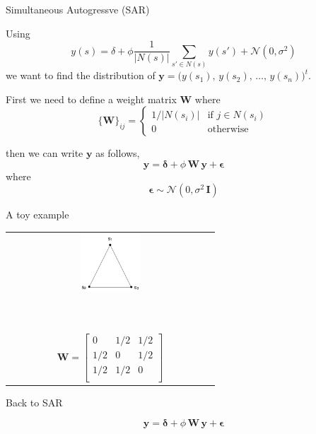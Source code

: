 \documentclass[11pt,ignorenonframetext,]{beamer}
\begin{document}
\begin{frame}[t]{Simultaneous Autogressve (SAR)}

\vspace{-3mm}

Using
\[ y(s) = \delta + \phi \frac{1}{|N(s)|}\sum_{s' \in N(s)} y(s') + \mathcal{N}(0,\sigma^2) \]
we want to find the distribution of
\(\bm{y} = \Big(y(s_1),\, y(s_2),\,\ldots,\,y(s_n)\Big)^t\).

\pause

\vspace{5mm}

First we need to define a weight matrix \(\bm W\) where \[ 
\{\bm W\}_{ij} = \begin{cases}
1/|N(s_i)| & \text{if $j \in N(s_i)$} \\
0        & \text{otherwise}
\end{cases}
\]

\pause

then we can write \(\bm y\) as follows,
\[ \bm{y} = \bm{\delta} + \phi \, \bm{W} \, \bm{y} + \bm{\epsilon} \]
where \[ \bm\epsilon \sim \mathcal{N}(0,\sigma^2 \, \bm{I}) \]

\end{frame}

\begin{frame}[t]{A toy example}

\begin{tabular}{c}
\includegraphics[width=0.3\textwidth]{figs/triangle_adj.png} \\
~\\
~\\
$\bm{W} = \begin{bmatrix}
0   & 1/2 & 1/2 \\
1/2 & 0   & 1/2 \\
1/2 & 1/2 & 0   \\
\end{bmatrix}$
\end{tabular}

\end{frame}

\begin{frame}[t]{Back to SAR}

\[ \bm{y} = \bm{\delta} + \phi \, \bm{W} \, \bm{y} + \bm{\epsilon} \]

\end{frame}
\end{document}
